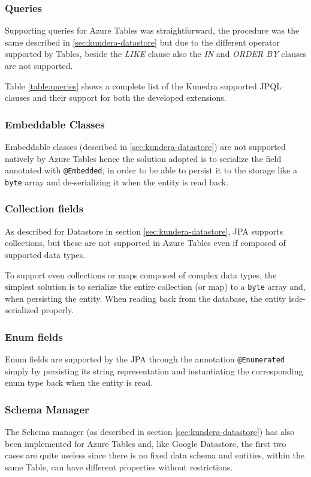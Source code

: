 \subsubsection{Queries}
Supporting queries for Azure Tables was straightforward, the procedure was the same described in \ref{sec:kundera-datastore} but due to the different operator supported by Tables, beside the \textit{LIKE} clause also the \textit{IN} and \textit{ORDER BY} clauses are not supported.

\newparagraph Table \ref{table:queries} shows a complete list of the Kunedra supported JPQL clauses and their support for both the developed extensions.

\subsubsection{Embeddable Classes}
Embeddable classes (described in \ref{sec:kundera-datastore}) are not supported natively by Azure Tables hence the solution adopted is to serialize the field annotated with \texttt{@Embedded}, in order to be able to persist it to the storage like a \texttt{byte} array and de-serializing it when the entity is read back.

\subsubsection{Collection fields}
As described for Datastore in section \ref{sec:kundera-datastore}, JPA supports collections, but these are not supported in Azure Tables even if composed of supported data types.

\noindent To support even collections or maps composed of complex data types, the simplest solution is to serialize the entire collection (or map) to a \texttt{byte} array and, when persisting the entity. When reading back from the database, the entity isde-serialized properly.

\subsubsection{Enum fields}
Enum fields are supported by the JPA through the annotation \texttt{@Enumerated}  simply by persisting its string representation and instantiating the corresponding enum type back when the entity is read.

\subsubsection{Schema Manager}
The Schema manager (as described in section \ref{sec:kundera-datastore}) has also been implemented for Azure Tables and, like Google Datastore, the first two cases are quite useless since there is no fixed data schema and entities, within the same Table, can have different properties without restrictions.

